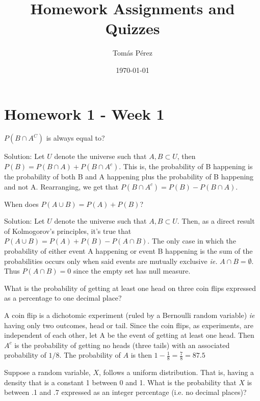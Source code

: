 \documentclass{homework}
\author{Tomás Pérez}
\date{\today}
\title{Homework Assignments and Quizzes}
\begin{document}
 \maketitle

\section{Homework 1 - Week 1}

\begin{tcolorbox}[title=Question 1]
$P(B\cap A^C)$ is always equal to?
\end{tcolorbox}

Solution: Let $U$ denote the universe such that $A, B \subset U$, then ${P}(B) = P(B\cap A)+P(B\cap A^c)$. This is, the probability of B happening is the probability of both B and A happening plus the probability of B happening and not A. Rearranging, we get that $P(B \cap A^c) = P(B) - P(B \cap A)$.\\

\begin{tcolorbox}[title=Question 2]
When does $P(A \cup B) = P(A) + P(B)$? 
\end{tcolorbox}

Solution: Let $U$ denote the universe such that $A, B \subset U$. Then, as a direct result of Kolmogorov's principles, it's true that ${\displaystyle P(A\cup B)=P(A)+P(B)-P(A\cap B)}.$ The only case in which the probability of either event A happening or event B happening is the sum of the probabilities occurs only when said events are mutually exclusive \textit{ie.} $A\cap B = \emptyset$. Thus $P(A\cap B)=0$ since the empty set has null measure. \\

\begin{tcolorbox}[title=Question 3]
What is the probability of getting at least one head on three coin flips expressed as a percentage to one decimal place?
\end{tcolorbox}

A coin flip is a dichotomic experiment (ruled by a Bernoulli random variable) \textit{ie} having only two outcomes, head or tail. Since the coin flips, as experiments, are independent of each other, let A be the event of getting at least one head. Then $A^c$  is the probability of getting no heads (three tails) with an associated probability of $1/8$. The probability of $A$ is then $1 - \frac{1}{8} = \frac{7}{8} = 87.5$ \\

\begin{tcolorbox}[title=Question 4]
Suppose a random variable, $X$, follows a uniform distribution. That is, having a density that is a constant 1 between 0 and 1. What is the probability that $X$ is between .1 and .7 expressed as an integer percentage (i.e. no decimal places)?
\end{tcolorbox}
\end{document}

